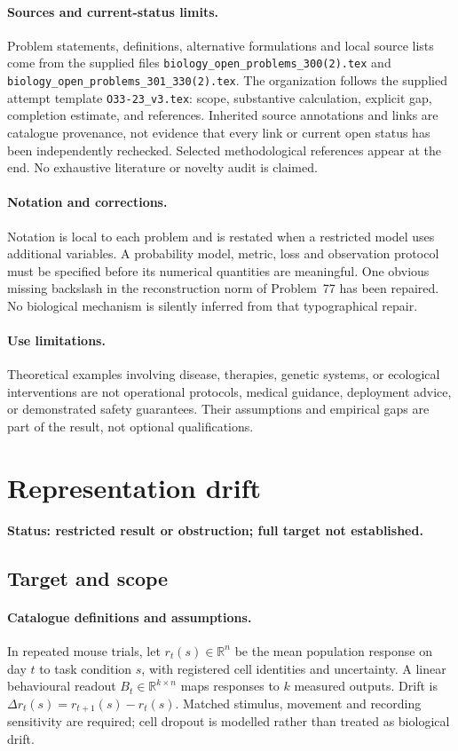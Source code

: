 \documentclass[11pt]{article}
\begin{document}
\paragraph{Sources and current-status limits.}
Problem statements, definitions, alternative formulations and local source lists
come from the supplied files
\texttt{biology\_open\_problems\_300(2).tex} and
\texttt{biology\_open\_problems\_301\_330(2).tex}.
The organization follows the supplied attempt template
\texttt{O33-23\_v3.tex}: scope, substantive calculation, explicit gap,
completion estimate, and references. Inherited source annotations and links are
catalogue provenance, not evidence that every link or current open status has
been independently rechecked. Selected methodological references appear at the
end. No exhaustive literature or novelty audit is claimed.

\paragraph{Notation and corrections.}
Notation is local to each problem and is restated when a restricted model uses
additional variables. A probability model, metric, loss and observation protocol
must be specified before its numerical quantities are meaningful. One obvious
missing backslash in the reconstruction norm of Problem~77 has been repaired.
No biological mechanism is silently inferred from that typographical repair.

\paragraph{Use limitations.}
Theoretical examples involving disease, therapies, genetic systems, or ecological
interventions are not operational protocols, medical guidance, deployment advice,
or demonstrated safety guarantees. Their assumptions and empirical gaps are part
of the result, not optional qualifications.


\section*{Representation drift}
\label{prob:107}
\noindent\textbf{Status: restricted result or obstruction; full target not established.}
\subsection{Target and scope}
\paragraph{Catalogue definitions and assumptions.}
In repeated mouse trials, let $r_t(s)\in\mathbb{R}^n$ be the mean population response on day $t$ to task condition $s$, with registered cell identities and uncertainty. A linear behavioural readout $B_t\in\mathbb{R}^{k\times n}$ maps responses to $k$ measured outputs. Drift is $\Delta r_t(s)=r_{t+1}(s)-r_t(s)$. Matched stimulus, movement and recording sensitivity are required; cell dropout is modelled rather than treated as biological drift.
\end{document}
